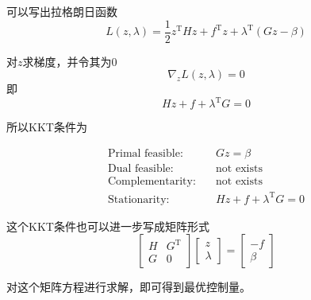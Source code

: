 \documentclass[withoutpreface,bwprint]{NoteBook}
\begin{document}
可以写出拉格朗日函数
\begin{equation}
\label{eq:block_KKT_lagrange_func}
L\left( z, \lambda \right) 
= \frac{1}{2} z^\mathrm{T} H z + f^\mathrm{T}z 
+ \lambda^\mathrm{T}(G z -\beta)
\end{equation}

对$z$求梯度，并令其为0
$$
\nabla_{z} L\left( z, \lambda \right) =0
$$
即
\begin{equation}
\label{eq:block_KKT_gradient_z}
H z + f + \lambda^\mathrm{T} G =0
\end{equation}

所以KKT条件为

\begin{align}
\label{eq:block_KKT_condition}
\text{Primal feasible:}& \quad
G z = \beta \\

\text{Dual feasible:}& \quad \text{not exists} \nonumber \\

\text{Complementarity:}& \quad \text{not exists} \nonumber \\

\text{Stationarity:}& \quad
H z + f + \lambda^\mathrm{T} G =0
\end{align}

这个KKT条件也可以进一步写成矩阵形式
\begin{equation}
\label{eq:block_KKT_condition_big_matrix_type}
\begin{bmatrix}
H & G^\mathrm{T} \\
G & 0 
\end{bmatrix}
\begin{bmatrix}
z \\
\lambda
\end{bmatrix}
=\begin{bmatrix}
-f \\
\beta
\end{bmatrix}
\end{equation}

对这个矩阵方程进行求解，即可得到最优控制量。
\end{document}
